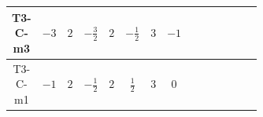 \documentclass[8pt]{article}
\begin{document}
\begin{landscape}
\begin{longtable}{@{}cccccccc >{\raggedright\arraybackslash}p{0.21\linewidth} >{\raggedright\arraybackslash}p{0.21\linewidth} >{\raggedright\arraybackslash}p{0.21\linewidth}@{}}
T3-C-m3 & $-3$ & $2$ & $-\frac{3}{2}$ & $2$ & $-\frac{1}{2}$ & $3$ & $-1$ & \scriptsize\adjustbox{max width=\linewidth}{$\begin{gathered} -S_{1,j_1} S_{1,j_1}{}^{\dagger } m_1^2 \\ +\frac{1}{2} S_{1,j_3} S_{1,j_4} S_{1,j_1}{}^{\dagger } S_{1,j_2}{}^{\dagger } \mathcal{I}_{S_1,j_1,j_3,j_2,j_4}{}^1 \lambda_{S_1}^{(1)}^{(1)}\end{gathered}$} & \scriptsize\adjustbox{max width=\linewidth}{$\begin{gathered} +D_{\mu _1}\left(S_{1,j_1}\right){}^{\dagger } D_{\mu _1}\left(S_{1,j_1}\right)\end{gathered}$} & \scriptsize\adjustbox{max width=\linewidth}{$\begin{gathered} -m_2^2 S_{2,j_1} S_{2,j_1}{}^{\dagger } \\ +\frac{1}{2} S_{2,j_3} S_{2,j_4} S_{2,j_1}{}^{\dagger } S_{2,j_2}{}^{\dagger } \mathcal{I}_{S_2,j_1,j_3,j_2,j_4}{}^1 \lambda_{S_2}^{(1)}^{(1)}\end{gathered}$} \\
\midrule
T3-C-m1 & $-1$ & $2$ & $-\frac{1}{2}$ & $2$ & $\frac{1}{2}$ & $3$ & $0$ & \scriptsize\adjustbox{max width=\linewidth}{$\begin{gathered} -S_{1,j_1} S_{1,j_1}{}^{\dagger } m_1^2 \\ +\frac{1}{2} S_{1,j_3} S_{1,j_4} S_{1,j_1}{}^{\dagger } S_{1,j_2}{}^{\dagger } \mathcal{I}_{S_1,j_1,j_3,j_2,j_4}{}^1 \lambda_{S_1}^{(1)}^{(1)}\end{gathered}$} & \scriptsize\adjustbox{max width=\linewidth}{$\begin{gathered} +D_{\mu _1}\left(S_{1,j_1}\right){}^{\dagger } D_{\mu _1}\left(S_{1,j_1}\right)\end{gathered}$} & \scriptsize\adjustbox{max width=\linewidth}{$\begin{gathered} -m_2^2 S_{2,j_1} S_{2,j_1}{}^{\dagger } \\ +\frac{1}{2} S_{2,j_3} S_{2,j_4} S_{2,j_1}{}^{\dagger } S_{2,j_2}{}^{\dagger } \mathcal{I}_{S_2,j_1,j_3,j_2,j_4}{}^1 \lambda_{S_2}^{(1)}^{(1)}\end{gathered}$} \\
\midrule

\end{longtable}
\end{landscape}
\end{document}
